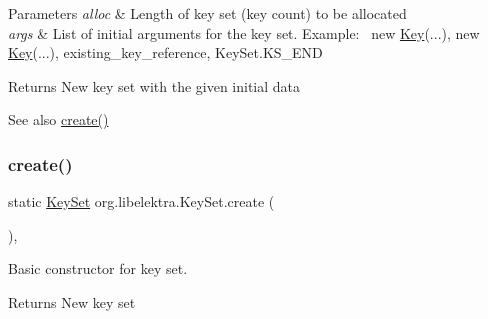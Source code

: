 \begin{DoxyParams}{Parameters}
{\em alloc} & Length of key set (key count) to be allocated \\
\hline
{\em args} & List of initial arguments for the key set. Example\+:~\newline
 new \hyperlink{classorg_1_1libelektra_1_1Key}{Key}(...), new \hyperlink{classorg_1_1libelektra_1_1Key}{Key}(...), existing\+\_\+key\+\_\+reference, Key\+Set.\+K\+S\+\_\+\+E\+ND \\
\hline
\end{DoxyParams}
\begin{DoxyReturn}{Returns}
New key set with the given initial data 
\end{DoxyReturn}
\begin{DoxySeeAlso}{See also}
\hyperlink{classorg_1_1libelektra_1_1KeySet_ac0ba4b88bef5e731b586f4ca63b9ab7f}{create()} 
\end{DoxySeeAlso}
\mbox{\label{classorg_1_1libelektra_1_1KeySet_ac0ba4b88bef5e731b586f4ca63b9ab7f}} 
\subsubsection{\texorpdfstring{create()}{create()}\hspace{0.1cm}{\footnotesize\ttfamily [2/3]}}
{\footnotesize\ttfamily static \hyperlink{classorg_1_1libelektra_1_1KeySet}{Key\+Set} org.\+libelektra.\+Key\+Set.\+create (\begin{DoxyParamCaption}{ }\end{DoxyParamCaption})\hspace{0.3cm}{\ttfamily [inline]}, {\ttfamily [static]}}



Basic constructor for key set. 

\begin{DoxyReturn}{Returns}
New key set 
\end{DoxyReturn}
\mbox{\label{classorg_1_1libelektra_1_1KeySet_a441d0e45a150a6fd5f75be00ec42338d}} 
